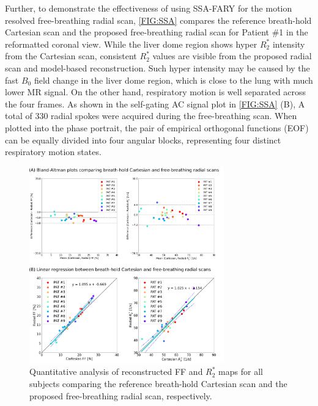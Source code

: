 \documentclass[journal,twoside,web]{ieeecolor}
\begin{document}
Further, to demonstrate the effectiveness of using SSA-FARY for 
the motion resolved free-breathing radial scan, 
\cref{FIG:SSA} compares the reference breath-hold Cartesian scan 
and the proposed free-breathing radial scan 
for Patient \#1 in the reformatted coronal view. 
While the liver dome region shows hyper $R_2^*$ intensity from the Cartesian scan, 
consistent $R_2^*$ values are visible 
from the proposed radial scan and model-based reconstruction. 
Such hyper intensity may be caused by the fast $B_0$ field change 
in the liver dome region, which is close to the lung with much lower MR signal. 
On the other hand, respiratory motion is well separated across the four frames. 
As shown in the self-gating AC signal plot in \cref{FIG:SSA} (B), 
A total of 330 radial spokes were acquired during the free-breathing scan. 
When plotted into the phase portrait, 
the pair of empirical orthogonal functions (EOF) can be equally divided into 
four angular blocks, representing four distinct respiratory motion states. 



\begin{figure}
	\centering
	\includegraphics[width=0.75\textwidth]{../../figures/tan7.pdf}
	\caption{Quantitative analysis of reconstructed FF and $R_2^*$ maps 
		for all subjects comparing the reference breath-hold Cartesian scan 
		and the proposed free-breathing radial scan, respectively.}
	\label{FIG:LINREG}
\end{figure}
\end{document}

